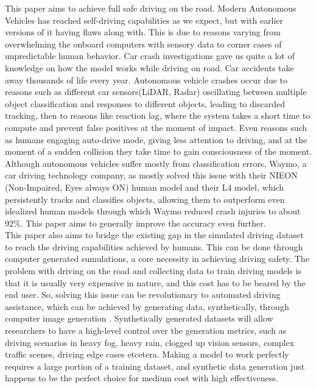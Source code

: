 This paper aims to achieve full safe driving on the road. Modern Autonomous Vehicles has reached self-driving capabilities as we expect, but with earlier versions of it having flaws along with. This is due to reasons varying from overwhelming the onboard computers with sensory data to corner cases of unpredictable human behavior. Car crash investigations gave us quite a lot of knowledge on how the model works while driving on road. Car accidents take away thousands of life every year. Autonomous vehicle crashes occur due to reasons such as different car sensors(LiDAR, Radar) oscillating between multiple object classification and responses to different objects, leading to discarded tracking, then to reasons like reaction lag, where the system takes a short time to compute and prevent false positives at the moment of impact. Even reasons such as humans engaging auto-drive mode, giving less attention to driving, and at the moment of a sudden collision they take time to gain consciousness of the moment. Although autonomous vehicles suffer mostly from classification errors, Waymo, a car driving technology company, as mostly solved this issue with their NIEON (Non-Impaired, Eyes always ON) human model and their L4 model, which persistently tracks and classifies objects, allowing them to outperform even idealized human models through which Waymo reduced crash injuries to about 92\%. This paper aims to generally improve the accuracy even further. \\
This paper also aims to bridge the existing gap in the simulated driving dataset to reach the driving capabilities achieved by humans. This can be done through computer generated sumulations, a core necessity in achieving driving safety. The problem with driving on the road and collecting data to train driving models is that it is usually very expensive in nature, and this cost has to be beared by the end user. So, solving this issue can be revolutionary to automated driving assistance, which can be achieved by generating data, synthetically, through computer image generation \cite{Leudet2018Virtual}. Synthetically generated datasets will allow researchers to have a high-level control over the generation metrics, such as driving scenarios in heavy fog, heavy rain, clogged up vision sensors, complex traffic scenes, driving edge cases etcetera. Making a model to work perfectly requires a large portion of a training dataset, and synthetic data generation just happens to be the perfect choice for medium cost with high effectiveness. \\
